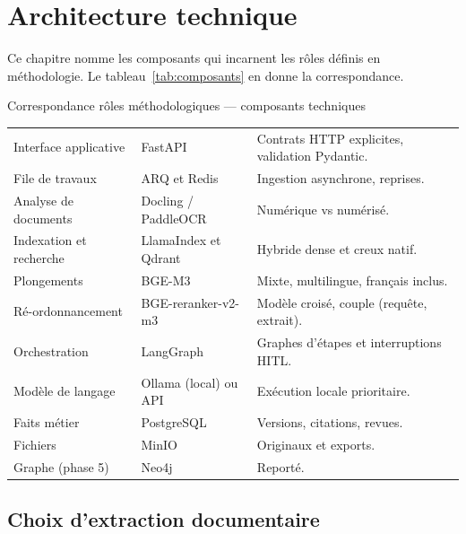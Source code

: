 \section{Architecture technique}
\label{sec:ch3-technique}

Ce chapitre nomme les composants qui incarnent les rôles définis en
méthodologie. Le tableau~\ref{tab:composants} en donne la correspondance.

\begin{btptable}{Correspondance rôles méthodologiques --- composants techniques}
\label{tab:composants}
\begin{tabularx}{\linewidth}{@{}L{4.0cm} Y L{3.6cm}@{}}
\toprule
{}
 &  &  \\
\midrule
Interface applicative & FastAPI & Contrats HTTP explicites, validation Pydantic. \\
File de travaux & ARQ et Redis & Ingestion asynchrone, reprises. \\
Analyse de documents & Docling / PaddleOCR & Numérique vs numérisé. \\
Indexation et recherche & LlamaIndex et Qdrant & Hybride dense et creux natif. \\
Plongements & BGE-M3 & Mixte, multilingue, français inclus. \\
Ré-ordonnancement & BGE-reranker-v2-m3 & Modèle croisé, couple (requête, extrait). \\
Orchestration & LangGraph & Graphes d'étapes et interruptions HITL. \\
Modèle de langage & Ollama (local) ou API & Exécution locale prioritaire. \\
Faits métier & PostgreSQL & Versions, citations, revues. \\
Fichiers & MinIO & Originaux et exports. \\
Graphe (phase 5) & Neo4j & Reporté. \\
\bottomrule
\end{tabularx}
\end{btptable}

\subsection{Choix d'extraction documentaire}

